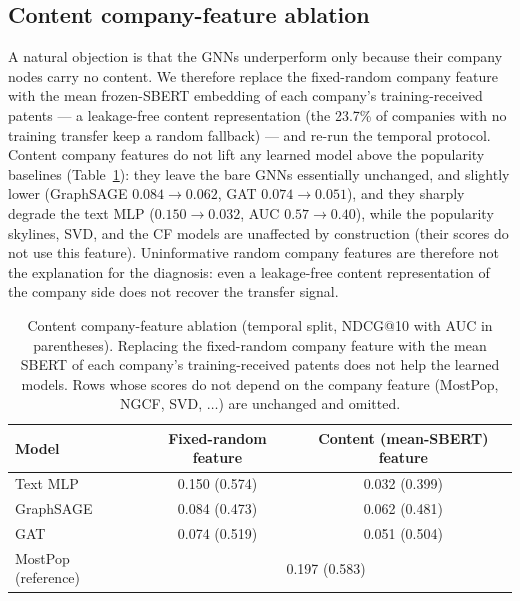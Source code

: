 \documentclass[preprint,12pt]{elsarticle}
\begin{document}
\subsection{Content company-feature ablation}
\label{sec:content}
A natural objection is that the GNNs underperform only because their company nodes
carry no content. We therefore replace the fixed-random company feature with the mean
frozen-SBERT embedding of each company's training-received patents --- a leakage-free
content representation (the 23.7\% of companies with no training transfer keep a random
fallback) --- and re-run the temporal protocol. Content company features do not lift
any learned model above the popularity baselines (Table~\ref{tab:content}): they leave
the bare GNNs essentially unchanged, and slightly lower (GraphSAGE
$0.084\!\to\!0.062$, GAT $0.074\!\to\!0.051$), and they sharply degrade the text MLP
($0.150\!\to\!0.032$, AUC $0.57\!\to\!0.40$), while the popularity skylines, SVD, and
the CF models are unaffected by construction (their scores do not use this feature).
Uninformative random company features are therefore not the explanation for the
diagnosis: even a leakage-free content representation of the company side does not
recover the transfer signal.

\begin{table}[t]
\centering
\caption{Content company-feature ablation (temporal split, NDCG@10 with AUC in
parentheses). Replacing the fixed-random company feature with the mean SBERT of each
company's training-received patents does not help the learned models. Rows whose scores
do not depend on the company feature (MostPop, NGCF, SVD, $\ldots$) are unchanged and
omitted.}
\label{tab:content}
\begin{tabular}{lcc}
\toprule
Model & Fixed-random feature & Content (mean-SBERT) feature \\
\midrule
Text MLP   & 0.150 (0.574) & 0.032 (0.399) \\
GraphSAGE  & 0.084 (0.473) & 0.062 (0.481) \\
GAT        & 0.074 (0.519) & 0.051 (0.504) \\
\midrule
MostPop (reference) & \multicolumn{2}{c}{0.197 (0.583)} \\
\bottomrule
\end{tabular}
\end{table}
\end{document}
